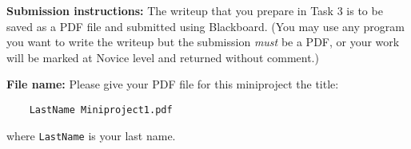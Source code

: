 \documentclass[11pt,letterpaper]{article}
\begin{document}
\hrulefill

\noindent
\textbf{Submission instructions:} The writeup that you prepare in Task 3 is to be saved as a PDF file and submitted using Blackboard. (You may use any program you want to write the writeup but the submission \emph{must} be a PDF, or your work will be marked at Novice level and returned without comment.)

\noindent
\textbf{File name:} Please give your PDF file for this miniproject the title: 
\begin{verbatim}
	LastName Miniproject1.pdf
\end{verbatim}
where \texttt{LastName} is your last name. 
\end{document}
